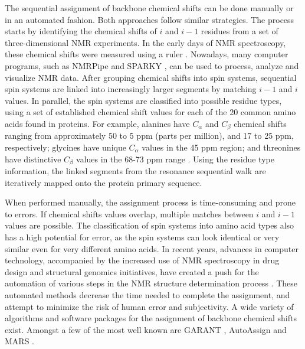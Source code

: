 \documentclass{article}
\begin{document}
The sequential assignment of backbone chemical shifts can be done manually or in an automated fashion. Both approaches follow similar strategies. The process starts by identifying the chemical shifts of $i$ and $i-1$  residues from a set of three-dimensional NMR experiments. In the early days of NMR spectroscopy, these chemical shifts were measured using a ruler \cite{guntert}. Nowadays, many computer programs, such as NMRPipe \cite{nmrpipe} and SPARKY \cite{zimmerman}, can be used to process, analyze and visualize NMR data. After grouping chemical shifts into spin systems, sequential spin systems are linked into increasingly larger segments by matching $i-1$  and $i$ values. In parallel, the spin systems are classified into possible residue types, using a set of established chemical shift values for each of the 20 common amino acids found in proteins. For example, alanines have $C_\alpha$ and $C_\beta$ chemical shifts ranging from approximately 50 to 5 ppm (parts per million), and 17 to 25 ppm, respectively; glycines have unique $C_\alpha$ values in the 45 ppm region; and threonines have distinctive $C_\beta$ values in the 68-73 ppm range \cite{biomagresbank}. Using the residue type information, the linked segments from the resonance sequential walk are iteratively mapped onto the protein primary sequence. 

When performed manually, the assignment process is time-consuming and prone to errors. If chemical shifts values overlap, multiple matches between $i$ and $i-1$  values are possible. The classification of spin systems into amino acid types also has a high potential for error, as the spin systems can look identical or very similar even for very different amino acids. In recent years, advances in computer technology, accompanied by the increased use of NMR spectroscopy in drug design and structural genomics initiatives, have created a push for the automation of various steps in the NMR structure determination process \cite{moseley}. These automated methods decrease the time needed to complete the assignment, and attempt to minimize the risk of human error and subjectivity. A wide variety of algorithms and software packages for the assignment of backbone chemical shifts exist. Amongst a few of the most well known are GARANT \cite{guntert}, AutoAssign \cite{zimmerman} and MARS \cite{mars}.
\end{document}
